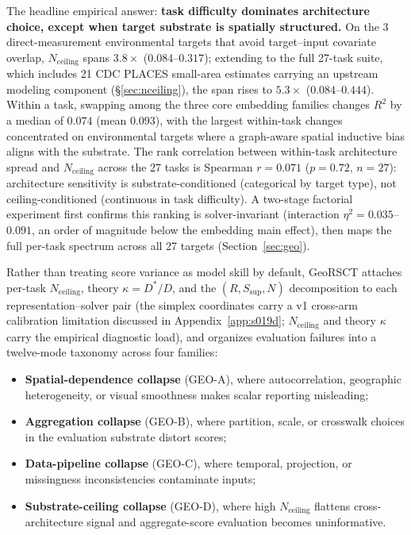 \documentclass{article}
\begin{document}
The headline empirical answer: \textbf{task difficulty dominates architecture choice, except when target substrate is spatially structured.} On the 3 direct-measurement environmental targets that avoid target--input covariate overlap, $N_{\text{ceiling}}$ spans $3.8{\times}$ ($0.084$--$0.317$); extending to the full 27-task suite, which includes 21 CDC PLACES small-area estimates carrying an upstream modeling component (\S\ref{sec:nceiling}), the span rises to $5.3{\times}$ ($0.084$--$0.444$). Within a task, swapping among the three core embedding families changes $R^2$ by a median of $0.074$ (mean $0.093$), with the largest within-task changes concentrated on environmental targets where a graph-aware spatial inductive bias aligns with the substrate. The rank correlation between within-task architecture spread and $N_{\text{ceiling}}$ across the 27 tasks is Spearman $r = 0.071$ ($p = 0.72$, $n = 27$): architecture sensitivity is substrate-conditioned (categorical by target type), not ceiling-conditioned (continuous in task difficulty). A two-stage factorial experiment first confirms this ranking is solver-invariant (interaction $\eta^2 = 0.035$--$0.091$, an order of magnitude below the embedding main effect), then maps the full per-task spectrum across all 27 targets (Section~\ref{sec:geo}).

Rather than treating score variance as model skill by default, GeoRSCT attaches per-task $N_{\text{ceiling}}$, theory $\kappa = D^*/D$, and the $(R, S_{\text{sup}}, N)$ decomposition to each representation--solver pair (the simplex coordinates carry a v1 cross-arm calibration limitation discussed in Appendix~\ref{app:s019d}; $N_{\text{ceiling}}$ and theory $\kappa$ carry the empirical diagnostic load), and organizes evaluation failures into a twelve-mode taxonomy across four families:
\begin{itemize}
\item \textbf{Spatial-dependence collapse} (GEO-A), where autocorrelation, geographic heterogeneity, or visual smoothness makes scalar reporting misleading;
\item \textbf{Aggregation collapse} (GEO-B), where partition, scale, or crosswalk choices in the evaluation substrate distort scores;
\item \textbf{Data-pipeline collapse} (GEO-C), where temporal, projection, or missingness inconsistencies contaminate inputs;
\item \textbf{Substrate-ceiling collapse} (GEO-D), where high $N_{\text{ceiling}}$ flattens cross-architecture signal and aggregate-score evaluation becomes uninformative.
\end{itemize}
\end{document}
